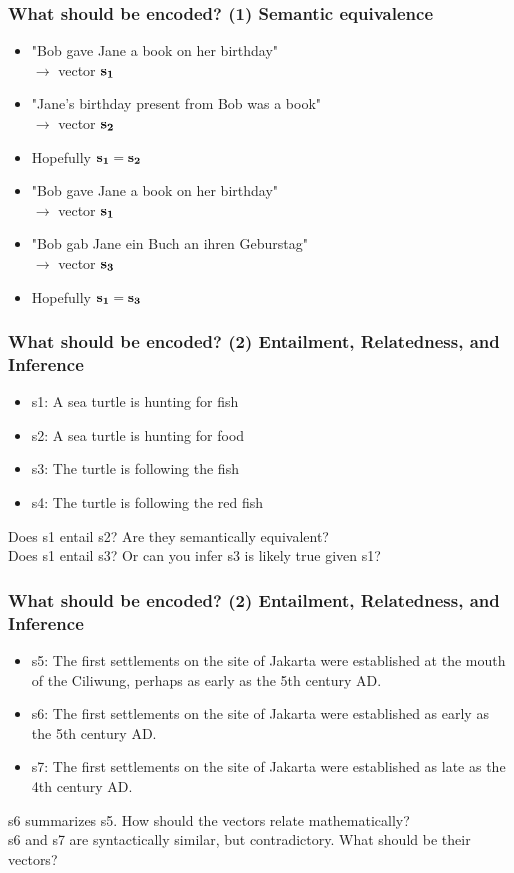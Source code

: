 \documentclass{beamer}
\newcommand{\bi}{\begin{itemize}}
\newcommand{\ei}{\end{itemize}}
\begin{document}
\begin{frame}
\frametitle{What should be encoded? (1) Semantic equivalence}
\bi
\item "Bob gave Jane a book on her birthday"\\\hspace{1cm}$\rightarrow$ vector ${\bf s_1}$
\item "Jane's birthday present from Bob was a book"\\\hspace{1cm} $\rightarrow$ vector ${\bf s_2}$
\item Hopefully ${\bf s_1}  = {\bf s_2}$
\pause
\vspace{0.6cm}
\item "Bob gave Jane a book on her birthday"\\\hspace{1cm}$\rightarrow$ vector ${\bf s_1}$
\item "Bob gab Jane ein Buch an ihren Geburstag"\\\hspace{1cm} $\rightarrow$ vector ${\bf s_3}$
\item Hopefully ${\bf s_1}  = {\bf s_3}$
\ei
\end{frame}

\begin{frame}
\frametitle{What should be encoded? (2) Entailment, Relatedness, and Inference}
\bi
\item s1: A sea turtle is hunting for fish
\item s2: A sea turtle is hunting for food
\item s3: The turtle is following the fish
\item s4: The turtle is following the red fish
\ei
 Does s1 entail s2? Are they semantically equivalent?\\[0.2cm]
 Does s1 entail s3? Or can you infer s3 is likely true given s1? \\[0.2cm]
\end{frame}

\begin{frame}
\frametitle{What should be encoded? (2) Entailment, Relatedness, and Inference}
\bi
\item s5: The first settlements on the site of Jakarta were established at the mouth of the Ciliwung, perhaps as early as the 5th century AD.
\item s6: The first settlements on the site of Jakarta were established as early as the 5th century AD.
\item s7: The first settlements on the site of Jakarta were established as late as the 4th century AD.
\ei 
 s6 summarizes s5. How should the vectors relate mathematically?\\[0.2cm]
 s6 and s7 are syntactically similar, but contradictory. What should be their vectors? \\[0.2cm]
\end{frame}
\end{document}
